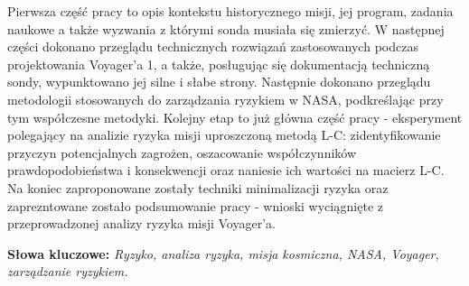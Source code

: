 Pierwsza część pracy to opis kontekstu historycznego misji, jej program, zadania naukowe a także wyzwania z którymi sonda musiała się zmierzyć. W następnej części dokonano przeglądu technicznych rozwiązań zastosowanych podczas projektowania Voyager'a 1, a także, posługując się dokumentacją techniczną sondy, wypunktowano jej silne i słabe strony. Następnie dokonano przeglądu metodologii stosowanych do zarządzania ryzykiem w NASA, podkreślając przy tym współczesne metodyki. Kolejny etap to już główna część pracy - eksperyment polegający na analizie ryzyka misji uproszczoną metodą L-C: zidentyfikowanie przyczyn potencjalnych zagrożen, oszacowanie współczynników prawdopodobieństwa i konsekwencji oraz naniesie ich wartości na macierz L-C. Na koniec zaproponowane zostały techniki minimalizacji ryzyka oraz zaprezntowane zostało podsumowanie pracy - wnioski wyciągnięte z przeprowadzonej analizy ryzyka misji Voyager'a.

\vspace*{\baselineskip}

\noindent\textbf{Słowa kluczowe:} \textit{Ryzyko, analiza ryzyka, misja kosmiczna, NASA, Voyager, zarządzanie ryzykiem.}
\newpage





